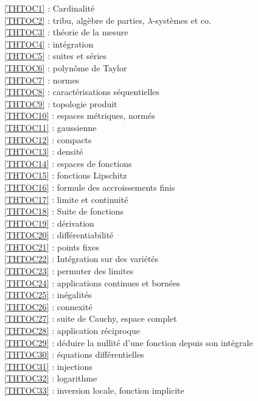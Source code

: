 \ref {THTOC1} : Cardinalité\\
\ref {THTOC2} : tribu, algèbre de parties, \( \lambda \)-systèmes et co.\\
\ref {THTOC3} : théorie de la mesure\\
\ref {THTOC4} : intégration\\
\ref {THTOC5} : suites et séries\\
\ref {THTOC6} : polynôme de Taylor\\
\ref {THTOC7} : normes\\
\ref {THTOC8} : caractérisations séquentielles\\
\ref {THTOC9} : topologie produit\\
\ref {THTOC10} : espaces métriques, normés\\
\ref {THTOC11} : gaussienne\\
\ref {THTOC12} : compacts\\
\ref {THTOC13} : densité\\
\ref {THTOC14} : espaces de fonctions\\
\ref {THTOC15} : fonctions Lipschitz\\
\ref {THTOC16} : formule des accroissements finis\\
\ref {THTOC17} : limite et continuité\\
\ref {THTOC18} : Suite de fonctions\\
\ref {THTOC19} : dérivation\\
\ref {THTOC20} : différentiabilité\\
\ref {THTOC21} : points fixes\\
\ref {THTOC22} : Intégration sur des variétés\\
\ref {THTOC23} : permuter des limites\\
\ref {THTOC24} : applications continues et bornées\\
\ref {THTOC25} : inégalités\\
\ref {THTOC26} : connexité\\
\ref {THTOC27} : suite de Cauchy, espace complet\\
\ref {THTOC28} : application réciproque\\
\ref {THTOC29} : déduire la nullité d'une fonction depuis son intégrale\\
\ref {THTOC30} : équations différentielles\\
\ref {THTOC31} : injections\\
\ref {THTOC32} : logarithme\\
\ref {THTOC33} : inversion locale, fonction implicite\\
